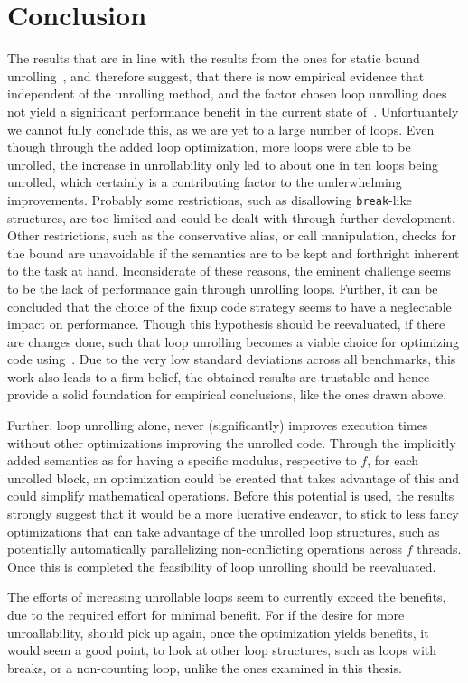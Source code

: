 \chapter{Conclusion}\label{sec:conclusion}

The results that are in line with the results from the ones for static bound unrolling~\cite{aebi18bachelorarbeit}, and therefore suggest, that there is now empirical evidence that independent of the unrolling method, and the factor chosen loop unrolling does not yield a significant performance benefit in the current state of~\libFIRM.
Unfortuantely we cannot fully conclude this, as we are yet to a large number of loops.
Even though through the added loop optimization, more loops were able to be unrolled, the increase in unrollability only led to about one in ten loops being unrolled, which certainly is a contributing factor to the underwhelming improvements.
Probably some restrictions, such as disallowing \texttt{break}-like structures, are too limited and could be dealt with through further development.
Other restrictions, such as the conservative alias, or call manipulation, checks for the bound are unavoidable if the semantics are to be kept and forthright inherent to the task at hand.
Inconsiderate of these reasons, the eminent challenge seems to be the lack of performance gain through unrolling loops.
Further, it can be concluded that the choice of the fixup code strategy seems to have a neglectable impact on performance.
Though this hypothesis should be reevaluated, if there are changes done, such that loop unrolling becomes a viable choice for optimizing code using~\libFIRM.
Due to the very low standard deviations across all benchmarks, this work also leads to a firm belief, the obtained results are trustable and hence provide a solid foundation for empirical conclusions, like the ones drawn above.

Further, loop unrolling alone, never (significantly) improves execution times without other optimizations improving the unrolled code.
Through the implicitly added semantics as for having a specific modulus, respective to $f$, for each unrolled block, an optimization could be created that takes advantage of this and could simplify mathematical operations.
Before this potential is used, the results strongly suggest that it would be a more lucrative endeavor, to stick to less fancy optimizations that can take advantage of the unrolled loop structures, such as potentially automatically parallelizing non-conflicting operations across $f$ threads.
Once this is completed the feasibility of loop unrolling should be reevaluated.

The efforts of increasing unrollable loops seem to currently exceed the benefits, due to the required effort for minimal benefit.
For if the desire for more unroallability, should pick up again, once the optimization yields benefits, it would seem a good point, to look at other loop structures, such as loops with breaks, or a non-counting loop, unlike the ones examined in this thesis.
